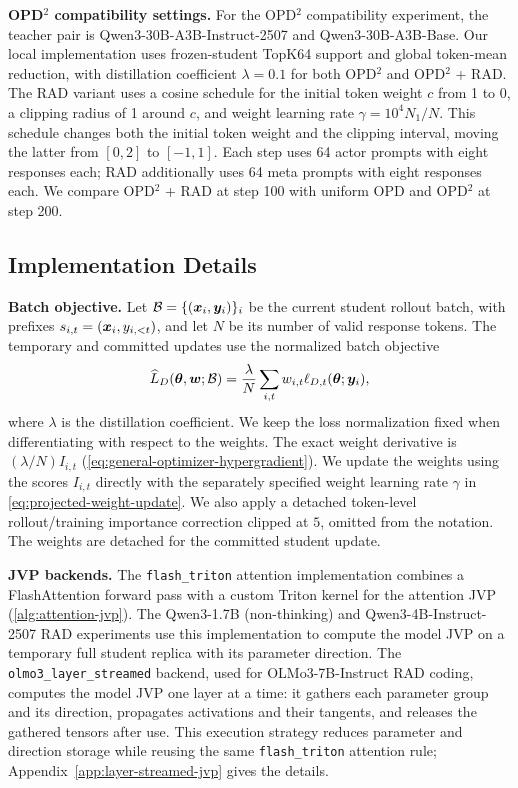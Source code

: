 \documentclass{article} %
\begin{document}
\noindent\textbf{OPD$^2$ compatibility settings.}\enspace
For the OPD$^2$ compatibility experiment, the teacher pair is
Qwen3-30B-A3B-Instruct-2507 and Qwen3-30B-A3B-Base. Our local
implementation uses frozen-student TopK64 support and global token-mean
reduction, with distillation coefficient \(\lambda=0.1\) for both
OPD$^2$ and OPD$^2$ + RAD.
The RAD variant uses a cosine schedule for the initial token weight \(c\)
from 1 to 0, a clipping radius of 1 around \(c\), and weight learning rate
\(\gamma=10^4 N_1/N\). This schedule changes both
the initial token weight and the clipping interval, moving the latter from
\([0,2]\) to \([-1,1]\). Each step uses 64 actor
prompts with eight responses each; RAD additionally uses 64 meta prompts
with eight responses each. We compare OPD$^2$ + RAD at step 100 with
uniform OPD and OPD$^2$ at step 200.

\subsection{Implementation Details}
\label{app:implementation-details}

\noindent\textbf{Batch objective.}\enspace
Let \(\mathcal B=\{(\bm{x}_i,\bm{y}_i)\}_i\) be the current student rollout
batch, with prefixes \(s_{i,t}=(\bm{x}_i,y_{i,<t})\), and let \(N\) be its
number of valid response tokens. The temporary and committed updates use
the normalized batch objective
\begin{equation}
    \widehat L_D(\bm{\theta},\bm{w};\mathcal B)
    =\frac{\lambda}{N}\sum_{i,t}w_{i,t}\ell_{D,t}(\bm{\theta};\bm{y}_i),
    \label{eq:batch-rkl}
\end{equation}
where \(\lambda\) is the distillation coefficient. We keep the loss normalization
fixed when differentiating with respect to the weights. The exact weight
derivative is \((\lambda/N)I_{i,t}\)
(\cref{eq:general-optimizer-hypergradient}). We update the weights using
the scores \(I_{i,t}\) directly with the separately specified weight learning
rate \(\gamma\) in \cref{eq:projected-weight-update}.
We also apply a detached token-level
rollout/training importance correction clipped at \(5\), omitted from the
notation. The weights are detached for the committed student update.

\noindent\textbf{JVP backends.}\enspace
The \texttt{flash\_triton} attention implementation combines a FlashAttention
forward pass with a custom Triton kernel for the attention JVP
(\cref{alg:attention-jvp}). The Qwen3-1.7B (non-thinking) and
Qwen3-4B-Instruct-2507 RAD experiments use this implementation to compute
the model JVP on a temporary full student replica with its parameter direction.
The \texttt{olmo3\_layer\_streamed} backend, used for OLMo3-7B-Instruct RAD
coding, computes the model JVP one layer at a time: it gathers each parameter
group and its direction, propagates activations and their tangents, and releases
the gathered tensors after use. This execution strategy reduces parameter and
direction storage while reusing the same \texttt{flash\_triton} attention rule;
Appendix~\ref{app:layer-streamed-jvp} gives the details.
\end{document}

